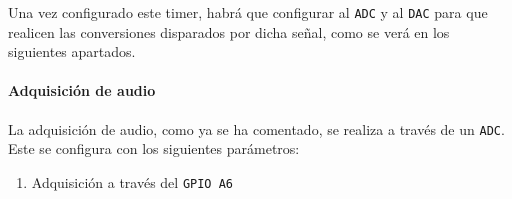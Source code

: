 Una vez configurado este timer, habrá que configurar al \texttt{ADC} y al \texttt{DAC} para que realicen las conversiones disparados por dicha señal, como se verá en los siguientes apartados.

\paragraph{Adquisición de audio}

La adquisición de audio, como ya se ha comentado, se realiza a través de un \texttt{ADC}. Este se configura con los siguientes parámetros:
\begin{enumerate}
    \item Adquisición a través del \texttt{GPIO A6}
\end{enumerate}